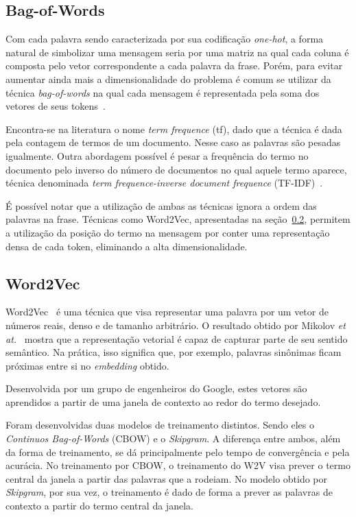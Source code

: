 \subsection{Bag-of-Words}

Com cada palavra sendo caracterizada por sua codificação \textit{one-hot}, a forma natural de simbolizar uma mensagem
seria por uma matriz na qual cada coluna é composta pelo vetor correspondente a cada palavra da frase.
Porém, para evitar aumentar ainda mais a dimensionalidade do problema é comum se utilizar da técnica \textit{bag-of-words}
na qual cada mensagem é representada pela soma dos vetores de seus tokens~\cite{schutze08}.

Encontra-se na literatura o nome \textit{term frequence} (tf), dado que a técnica é dada pela contagem de termos de um
documento.
Nesse caso as palavras são pesadas igualmente.
Outra abordagem possível é pesar a frequência do termo no documento pelo inverso do número de documentos no qual aquele
termo aparece, técnica denominada \textit{term frequence-inverse document frequence} (TF-IDF)~\cite{salton88}.

É possível notar que a utilização de ambas as técnicas ignora a ordem das palavras na frase.
Técnicas como Word2Vec, apresentadas na seção~\ref{w2v}, permitem a utilização da posição do termo na mensagem por conter
uma representação densa de cada token, eliminando a alta dimensionalidade.

\subsection{Word2Vec}\label{w2v}

Word2Vec~\cite{mikolov13} é uma técnica que visa representar uma palavra por um vetor de números reais, denso e de
tamanho arbitrário.
O resultado obtido por Mikolov \textit{et at.}~\cite{mikolov13} mostra que a representação vetorial é capaz de capturar
parte de seu sentido semântico.
Na prática, isso significa que, por exemplo, palavras sinônimas ficam próximas entre si no \textit{embedding} obtido.

Desenvolvida por um grupo de engenheiros do Google, estes vetores são aprendidos a partir de uma janela de contexto
ao redor do termo desejado.

Foram desenvolvidas duas modelos de treinamento distintos.
Sendo eles o \textit{Continuos Bag-of-Words} (CBOW) e o \textit{Skipgram}.
A diferença entre ambos, além da forma de treinamento, se dá principalmente pelo tempo de convergência e pela acurácia.
No treinamento por CBOW, o treinamento do W2V visa prever o termo central da janela a partir das palavras que a rodeiam.
No modelo obtido por \textit{Skipgram}, por sua vez, o treinamento é dado de forma a prever as palavras de contexto a
partir do termo central da janela.

